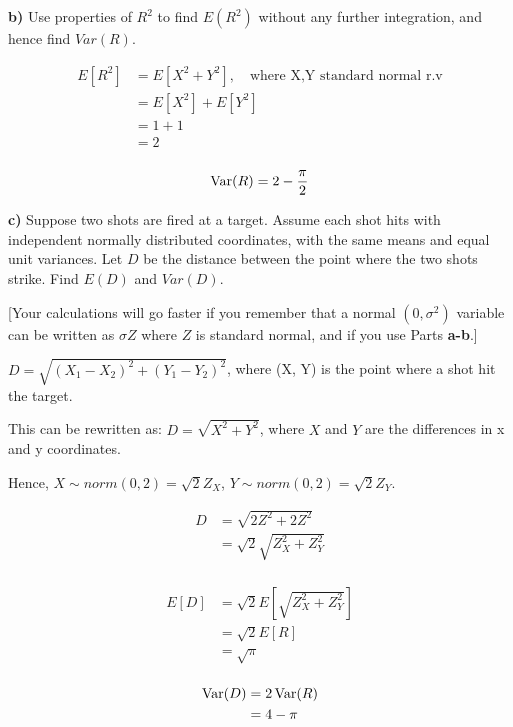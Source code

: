 \documentclass[11pt]{article}
\begin{document}
\textbf{b)} Use properties of \(R^2\) to find \(E(R^2)\) without any
further integration, and hence find \(Var(R)\).

\begin{align*}
	E[R^{2}] &= E[X^{2} + Y^{2}], \quad \text{where X,Y standard normal r.v}\\
	&= E[X^{2}] + E[Y^{2}] \\
	&= 1 + 1 \\
	&= 2 \\
\end{align*}

\[
\operatorname{Var}(R) = 2 - \frac{\pi}{2}
\]


\textbf{c)} Suppose two shots are fired at a target. Assume each shot
hits with independent normally distributed coordinates, with the same
means and equal unit variances. Let \(D\) be the distance between the
point where the two shots strike. Find \(E(D)\) and \(Var(D)\).

{[}Your calculations will go faster if you remember that a normal
\((0, \sigma^2)\) variable can be written as \(\sigma Z\) where \(Z\) is
standard normal, and if you use Parts \textbf{a-b}.{]}


$ D = \sqrt{(X_1-X_2)^{2} + (Y_{1} - Y_{2})^{2}} $, where (X, Y) is the point where a shot hit the target. 


This can be rewritten as: $D = \sqrt{X^{2} + Y^{2}} $, where $ X $ and $ Y $ are the differences in x and y coordinates. 

Hence, $ X \sim norm(0, 2) = \sqrt{2}Z_{X} $, $ Y \sim norm(0,2) = \sqrt{2}Z_{Y} $.  

\begin{align*}
	D &= \sqrt{2Z^{2} + 2Z^{2}} \\
	  &= \sqrt{2} \sqrt{Z_{X}^{2} + Z_{Y}^{2}} \\
\end{align*}


\begin{align*}
	E[D] &= \sqrt{2}E[\sqrt{Z_{X}^{2} + Z_{Y}^{2}}] \\
	     &= \sqrt{2} E[R] \\
	     &= \sqrt{\pi} \\
\end{align*}

\begin{align*}
	\operatorname{Var}(D) &= 2 \operatorname{Var}(R) \\
	&= 4 - \pi \\
\end{align*}
\end{document}
